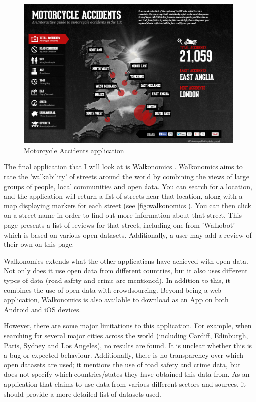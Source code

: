 \documentclass[authoryearcitations]{UoYCSproject}
\begin{document}
\begin{figure}
	\includegraphics[scale=0.3]{motorcycle}
	\caption{Motorcycle Accidents application}
	\label{fig:motorcycle}
\end{figure}

The final application that I will look at is Walkonomics \citep{Davies}. Walkonomics aims to rate the 'walkability' of streets around the world by combining the views of large groups of people, local communities and open data. You can search for a location, and the application will return a list of streets near that location, along with a map displaying markers for each street (see \autoref{fig:walkonomics}). You can then click on a street name in order to find out more information about that street. This page presents a list of reviews for that street, including one from 'Walkobot' which is based on various open datasets. Additionally, a user may add a review of their own on this page. 

Walkonomics extends what the other applications have achieved with open data. Not only does it use open data from different countries, but it also uses different types of data (road safety and crime are mentioned). In addition to this, it combines the use of open data with crowdsourcing. Beyond being a web application, Walkonomics is also available to download as an App on both Android and iOS devices.

However, there are some major limitations to this application. For example, when searching for several major cities across the world (including Cardiff, Edinburgh, Paris, Sydney and Los Angeles), no results are found. It is unclear whether this is a bug or expected behaviour. Additionally, there is no transparency over which open datasets are used; it mentions the use of road safety and crime data, but does not specify which countries/states they have obtained this data from. As an application that claims to use data from various different sectors and sources, it should provide a more detailed list of datasets used.
\end{document}
